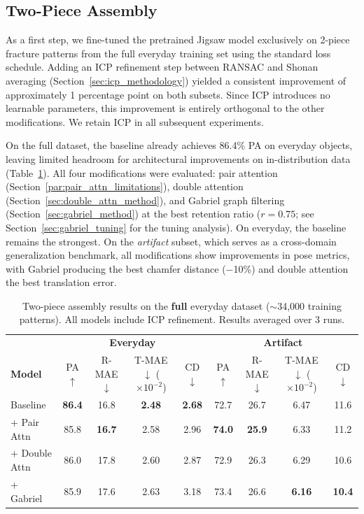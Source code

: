 \subsection{Two-Piece Assembly}

As a first step, we fine-tuned the pretrained Jigsaw model exclusively on 2-piece fracture patterns from the full everyday training set using the standard loss schedule. Adding an ICP refinement step between RANSAC and Shonan averaging (Section~\ref{sec:icp_methodology}) yielded a consistent improvement of approximately 1 percentage point on both subsets. Since ICP introduces no learnable parameters, this improvement is entirely orthogonal to the other modifications. We retain ICP in all subsequent experiments.

On the full dataset, the baseline already achieves 86.4\% PA on everyday objects, leaving limited headroom for architectural improvements on in-distribution data (Table~\ref{tab:two_piece_complete}). All four modifications were evaluated: pair attention (Section~\ref{par:pair_attn_limitations}), double attention (Section~\ref{sec:double_attn_method}), and Gabriel graph filtering (Section~\ref{sec:gabriel_method}) at the best retention ratio ($r{=}0.75$; see Section~\ref{sec:gabriel_tuning} for the tuning analysis). On everyday, the baseline remains the strongest. On the \textit{artifact} subset, which serves as a cross-domain generalization benchmark, all modifications show improvements in pose metrics, with Gabriel producing the best chamfer distance ($-$10\%) and double attention the best translation error.

\begin{table}[H]
\centering
\caption{Two-piece assembly results on the \textbf{full} everyday dataset ($\sim$34,000 training patterns). All models include ICP refinement. Results averaged over 3 runs.}
\label{tab:two_piece_complete}
\begin{tabular}{l|cccc|cccc}
\toprule
& \multicolumn{4}{c|}{\textbf{Everyday}} & \multicolumn{4}{c}{\textbf{Artifact}} \\
\textbf{Model} & PA$\uparrow$ & R-MAE$\downarrow$ & \shortstack{T-MAE$\downarrow$\\($\times 10^{-2}$)} & CD$\downarrow$
               & PA$\uparrow$ & R-MAE$\downarrow$ & \shortstack{T-MAE$\downarrow$\\($\times 10^{-2}$)} & CD$\downarrow$ \\
\midrule
Baseline      & \textbf{86.4} & 16.8 & \textbf{2.48} & \textbf{2.68} & 72.7 & 26.7 & 6.47 & 11.6 \\
+ Pair Attn   & 85.8 & \textbf{16.7} & 2.58 & 2.96 & \textbf{74.0} & \textbf{25.9} & 6.33 & 11.2 \\
+ Double Attn & 86.0 & 17.8 & 2.60 & 2.87 & 72.9 & 26.3 & 6.29 & 10.6 \\
+ Gabriel     & 85.9 & 17.6 & 2.63 & 3.18 & 73.4 & 26.6 & \textbf{6.16} & \textbf{10.4} \\
\bottomrule
\end{tabular}
\end{table}

